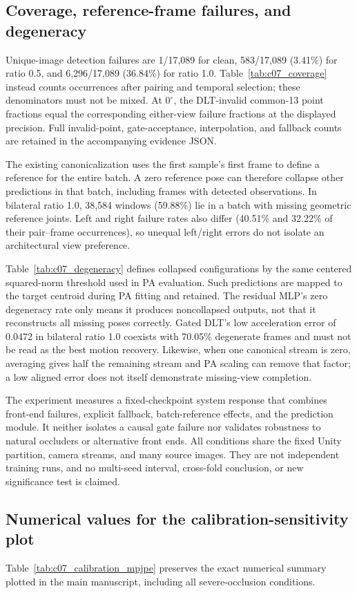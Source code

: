 
\FloatBarrier

\FloatBarrier

\FloatBarrier

\subsection{Coverage, reference-frame failures, and degeneracy}
Unique-image detection failures are 1/17,089 for clean, 583/17,089 (3.41\%) for ratio 0.5, and 6,296/17,089 (36.84\%) for ratio 1.0. Table~\ref{tab:c07_coverage} instead counts occurrences after pairing and temporal selection; these denominators must not be mixed. At $0^\circ$, the DLT-invalid common-13 point fractions equal the corresponding either-view failure fractions at the displayed precision. Full invalid-point, gate-acceptance, interpolation, and fallback counts are retained in the accompanying evidence JSON.



The existing canonicalization uses the first sample's first frame to define a reference for the entire batch. A zero reference pose can therefore collapse other predictions in that batch, including frames with detected observations. In bilateral ratio 1.0, 38,584 windows (59.88\%) lie in a batch with missing geometric reference joints. Left and right failure rates also differ (40.51\% and 32.22\% of their pair--frame occurrences), so unequal left/right errors do not isolate an architectural view preference.



Table~\ref{tab:c07_degeneracy} defines collapsed configurations by the same centered squared-norm threshold used in PA evaluation. Such predictions are mapped to the target centroid during PA fitting and retained. The residual MLP's zero degeneracy rate only means it produces noncollapsed outputs, not that it reconstructs all missing poses correctly. Gated DLT's low acceleration error of 0.0472 in bilateral ratio 1.0 coexists with 70.05\% degenerate frames and must not be read as the best motion recovery. Likewise, when one canonical stream is zero, averaging gives half the remaining stream and PA scaling can remove that factor; a low aligned error does not itself demonstrate missing-view completion.

The experiment measures a fixed-checkpoint system response that combines front-end failures, explicit fallback, batch-reference effects, and the prediction module. It neither isolates a causal gate failure nor validates robustness to natural occluders or alternative front ends. All conditions share the fixed Unity partition, camera streams, and many source images. They are not independent training runs, and no multi-seed interval, cross-fold conclusion, or new significance test is claimed.
\FloatBarrier

\subsection{Numerical values for the calibration-sensitivity plot}
Table~\ref{tab:c07_calibration_mpjpe} preserves the exact numerical summary plotted in the main manuscript, including all severe-occlusion conditions.

\FloatBarrier
